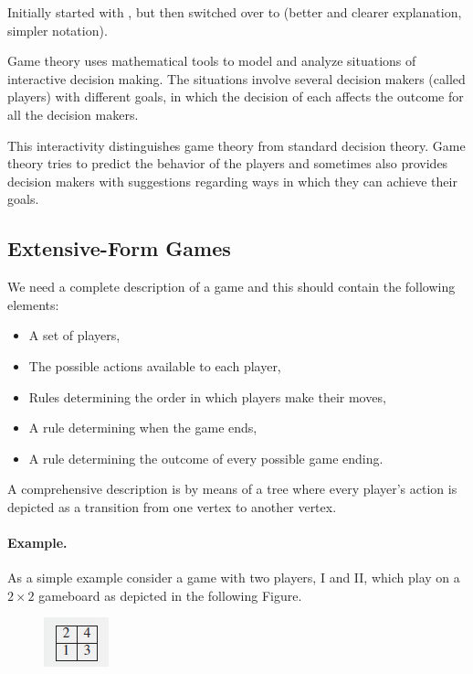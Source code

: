 
Initially started with \cite{Maschler2013}, but then switched over to \cite{Watson2013} (better and clearer explanation, simpler notation).

Game theory uses mathematical tools to model and analyze situations of interactive decision making. The situations involve several decision makers (called players) with different goals, in which the decision of each affects the outcome for all the decision makers.

This interactivity distinguishes game theory from standard decision theory. Game theory tries to predict the behavior of the players and sometimes also provides decision makers with suggestions regarding ways in which they can achieve their goals.

\subsection{Extensive-Form Games}

We need a complete description of a game and this should contain the following elements:

\begin{itemize}
\item A set of players,
\item The possible actions available to each player,
\item Rules determining the order in which players make their moves,
\item A rule determining when the game ends,
\item A rule determining the outcome of every possible game ending.
\end{itemize}

A comprehensive description is by means of a tree where every player’s action is depicted as a transition from one vertex to another vertex.

\paragraph{Example.} As a simple example consider a game with two players, I and II, which play on a $2 \times 2$ gameboard as depicted in the following Figure.

\begin{figure}[H]
    \centering
    \includegraphics[scale=1.2]{images/2023-10-10-game_theory_01.png}
\end{figure}

